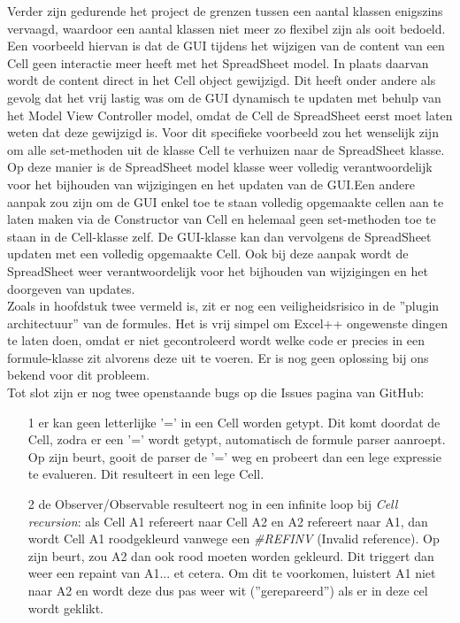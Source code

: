 \documentclass[a4paper,11pt,titlepage]{scrartcl}
\begin{document}
Verder zijn gedurende het project de grenzen tussen een aantal klassen enigszins vervaagd, waardoor een aantal klassen niet meer zo flexibel zijn als ooit bedoeld. Een voorbeeld hiervan is dat de GUI tijdens het wijzigen van de content van een Cell geen interactie meer heeft met het SpreadSheet model. In plaats daarvan wordt de content direct in het Cell object gewijzigd. Dit heeft onder andere als gevolg dat het vrij lastig was om de GUI dynamisch te updaten met behulp van het Model View Controller model, omdat de Cell de SpreadSheet eerst moet laten weten dat deze gewijzigd is. Voor dit specifieke voorbeeld zou het wenselijk zijn om alle set-methoden uit de klasse Cell te verhuizen naar de SpreadSheet klasse. Op deze manier is de SpreadSheet model klasse weer volledig verantwoordelijk voor het bijhouden van wijzigingen en het updaten van de GUI.\newpage Een andere aanpak zou zijn om de GUI enkel toe te staan volledig opgemaakte cellen aan te laten maken via de Constructor van Cell en helemaal geen set-methoden toe te staan in de Cell-klasse zelf. De GUI-klasse kan dan vervolgens de SpreadSheet updaten met een volledig opgemaakte Cell. Ook bij deze aanpak wordt de SpreadSheet weer verantwoordelijk voor het bijhouden van wijzigingen en het doorgeven van updates.\\

Zoals in hoofdstuk twee vermeld is, zit er nog een veiligheidsrisico in de ''plugin architectuur'' van de formules. Het is vrij simpel om Excel++ ongewenste dingen te laten doen, omdat er niet gecontroleerd wordt welke code er precies in een formule-klasse zit alvorens deze uit te voeren. Er is nog geen oplossing bij ons bekend voor dit probleem.\\

Tot slot zijn er nog twee openstaande bugs op die Issues pagina van GitHub:
\begin{itemize}
	\item[1] er kan geen letterlijke '=' in een Cell worden getypt. Dit komt doordat de Cell, zodra er een '=' wordt getypt, automatisch de formule parser aanroept. Op zijn beurt, gooit de parser de '=' weg en probeert dan een lege expressie te evalueren. Dit resulteert in een lege Cell.
	\item[2] de Observer/Observable resulteert nog in een infinite loop bij \textit{Cell recursion}: als Cell A1 refereert naar Cell A2 en A2 refereert naar A1, dan wordt Cell A1 roodgekleurd vanwege een \textit{\#REFINV} (Invalid reference). Op zijn beurt, zou A2 dan ook rood moeten worden gekleurd. Dit triggert dan weer een repaint van A1... et cetera. Om dit te voorkomen, luistert A1 niet naar A2 en wordt deze dus pas weer wit (''gerepareerd'') als er in deze cel wordt geklikt.
\end{itemize}
\end{document}

